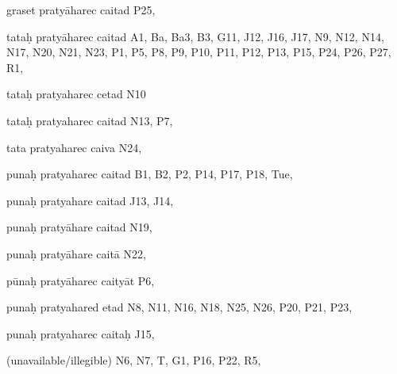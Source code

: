 \begin{ekdosis}
\begin{marma}[hp01_055]
\begin{marma}[hp02_009]
\begin{marma}[hp02_011]
 \begin{marma}[hp02_24c]
\item[graset pratyāharec caitad] P25, 
\item[tataḥ pratyāharec caitad] A1, Ba, Ba3, B3, G11, J12, J16, J17, N9, N12, N14, N17, N20, N21, N23, P1, P5, P8, P9, P10, P11, P12, P13, P15, P24, P26, P27, R1,
\item[tataḥ pratyaharec cetad] N10
\item[tataḥ pratyaharec caitad] N13, P7, 
\item[tata pratyaharec caiva] N24,
\item[punaḥ pratyaharec caitad] B1, B2, P2, P14, P17, P18, Tue,
\item[punaḥ pratyahare caitad] J13, J14, 
\item[punaḥ pratyāhare caitad] N19, 
\item[punaḥ pratyāhare caitā] N22,
\item[pūnaḥ pratyāharec caityāt] P6,
\item[punaḥ pratyahared etad] N8, N11, N16, N18, N25, N26, P20, P21, P23, 
\item[punaḥ pratyaharec caitaḥ] J15,
\item[(unavailable/illegible)] N6, N7, T, G1, P16, P22, R5,
  \begin{description}

    \end{description}
 \end{marma}


\end{marma}
\end{marma}
\end{marma}
\end{ekdosis}
